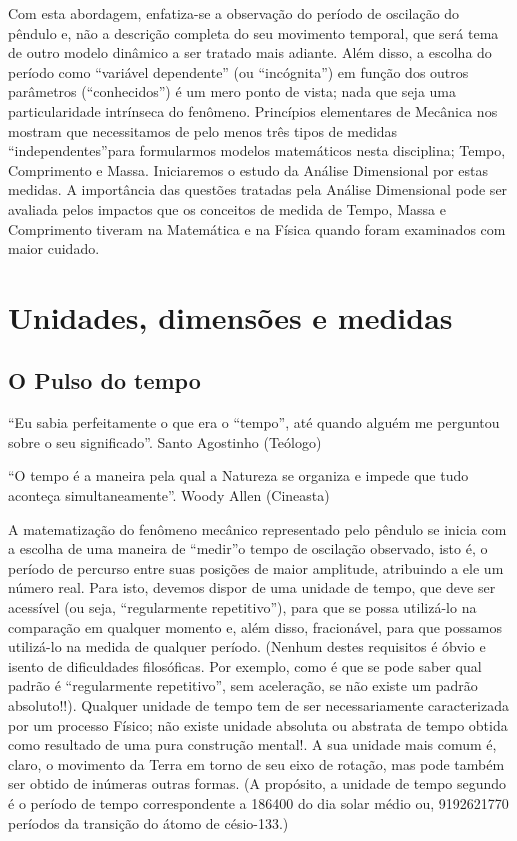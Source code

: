 Com esta abordagem, enfatiza-se a observação do período de oscilação do pêndulo e, não a descrição completa do seu movimento temporal, que será tema de outro modelo dinâmico a ser tratado mais adiante. Além disso, a escolha do período como “variável dependente” (ou “incógnita”) em função dos outros parâmetros (“conhecidos”) é um mero ponto de vista; nada que seja uma particularidade intrínseca do fenômeno. Princípios elementares de Mecânica nos mostram que necessitamos de pelo menos três tipos de medidas “independentes”para formularmos modelos matemáticos nesta disciplina; Tempo, Comprimento e Massa. Iniciaremos o estudo da Análise Dimensional por estas medidas. A importância das questões tratadas pela Análise Dimensional pode ser avaliada pelos impactos que os conceitos de medida de Tempo, Massa e Comprimento tiveram na Matemática e na Física quando foram examinados com maior cuidado.

\section{Unidades, dimensões e medidas}

\subsection{O Pulso do tempo}

“Eu sabia perfeitamente o que era o “tempo”, até quando alguém me perguntou sobre o seu significado”.
Santo Agostinho (Teólogo)

“O tempo é a maneira pela qual a Natureza se organiza e impede que tudo aconteça simultaneamente”.
Woody Allen (Cineasta)

A matematização do fenômeno mecânico representado pelo pêndulo se inicia com a escolha de uma maneira de “medir”o tempo de oscilação observado, isto é, o período de percurso entre suas posições de maior amplitude, atribuindo a ele um número real. Para isto, devemos dispor de uma unidade de tempo, que deve ser acessível (ou seja, “regularmente repetitivo”), para que se possa utilizá-lo na comparação em qualquer momento e, além disso, fracionável, para que possamos utilizá-lo na medida de qualquer período. (Nenhum destes requisitos é óbvio e isento de dificuldades filosóficas. Por exemplo, como é que se pode saber qual padrão é “regularmente repetitivo”, sem aceleração, se não existe um padrão absoluto!!). Qualquer unidade de tempo tem de ser necessariamente caracterizada por um processo Físico; não existe unidade absoluta ou abstrata de tempo obtida como resultado de uma pura construção mental!. A sua unidade mais comum é, claro, o movimento da Terra em torno de seu eixo de rotação, mas pode também ser obtido de inúmeras outras formas. (A propósito, a unidade de tempo segundo é o período de tempo correspondente a 186400 do dia solar médio ou, 9192621770 períodos da transição do átomo de césio-133.)

